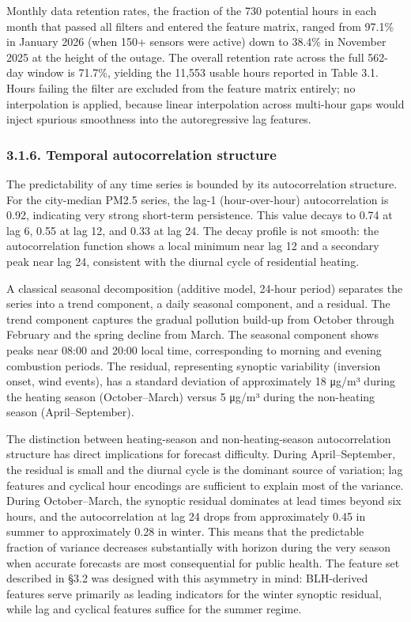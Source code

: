 Monthly data retention rates, the fraction of the 730 potential hours in each month that passed all filters and entered the feature matrix, ranged from 97.1\% in January 2026 (when 150+ sensors were active) down to 38.4\% in November 2025 at the height of the outage. The overall retention rate across the full 562-day window is 71.7\%, yielding the 11,553 usable hours reported in Table 3.1. Hours failing the filter are excluded from the feature matrix entirely; no interpolation is applied, because linear interpolation across multi-hour gaps would inject spurious smoothness into the autoregressive lag features.

\subsubsection{3.1.6. Temporal autocorrelation structure}\label{temporal-autocorrelation-structure}

The predictability of any time series is bounded by its autocorrelation structure. For the city-median PM2.5 series, the lag-1 (hour-over-hour) autocorrelation is 0.92, indicating very strong short-term persistence. This value decays to 0.74 at lag 6, 0.55 at lag 12, and 0.33 at lag 24. The decay profile is not smooth: the autocorrelation function shows a local minimum near lag 12 and a secondary peak near lag 24, consistent with the diurnal cycle of residential heating.

A classical seasonal decomposition (additive model, 24-hour period) separates the series into a trend component, a daily seasonal component, and a residual. The trend component captures the gradual pollution build-up from October through February and the spring decline from March. The seasonal component shows peaks near 08:00 and 20:00 local time, corresponding to morning and evening combustion periods. The residual, representing synoptic variability (inversion onset, wind events), has a standard deviation of approximately 18 μg/m³ during the heating season (October--March) versus 5 μg/m³ during the non-heating season (April--September).

The distinction between heating-season and non-heating-season autocorrelation structure has direct implications for forecast difficulty. During April--September, the residual is small and the diurnal cycle is the dominant source of variation; lag features and cyclical hour encodings are sufficient to explain most of the variance. During October--March, the synoptic residual dominates at lead times beyond six hours, and the autocorrelation at lag 24 drops from approximately 0.45 in summer to approximately 0.28 in winter. This means that the predictable fraction of variance decreases substantially with horizon during the very season when accurate forecasts are most consequential for public health. The feature set described in §3.2 was designed with this asymmetry in mind: BLH-derived features serve primarily as leading indicators for the winter synoptic residual, while lag and cyclical features suffice for the summer regime.

